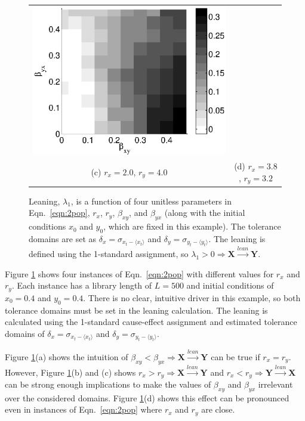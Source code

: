 \documentclass[twocolumn,aps,pre,groupedaddress]{revtex4-1}
\begin{document}
\begin{figure}[ht]
\begin{tabular}{cc}
\includegraphics[scale=0.30]{CoupLogexample_rx38ry32.eps} \\
(c) $r_x = 2.0$, $r_y = 4.0$ & (d) $r_x = 3.8$, $r_y = 3.2$ \\
\end{tabular}
\caption{Leaning, $\lambda_1$, is a function of four unitless parameters in Eqn.\ \ref{eqn:2pop}, $r_x$, $r_y$, $\beta_{xy}$, and $\beta_{yx}$ (along with the initial conditions $x_0$ and $y_0$, which are fixed in this example).  The tolerance domains are set as $\delta_x = \sigma_{x_t-\langle x_t \rangle}$ and $\delta_y = \sigma_{y_t-\langle y_t \rangle}$.  The leaning is defined using the 1-standard assignment, so $\lambda_1>0\Rightarrow\mathbf{X}\xrightarrow{lean}\mathbf{Y}$.}
\label{fig:2pop}
\end{figure}
Figure \ref{fig:2pop} shows four instances of Eqn.\ \ref{eqn:2pop} with different values for $r_x$ and $r_y$.  Each instance has a library length of $L=500$ and initial conditions of $x_0 = 0.4$ and $y_0 = 0.4$.  There is no clear, intuitive driver in this example, so both tolerance domains must be set in the leaning calculation.  The leaning is calculated using the 1-standard cause-effect assignment and estimated tolerance domains of $\delta_x = \sigma_{x_t-\langle x_t \rangle}$ and $\delta_y = \sigma_{y_t-\langle y_t \rangle}$.

Figure \ref{fig:2pop}(a) shows the intuition of $\beta_{xy}<\beta_{yx}\Rightarrow\mathbf{X}\xrightarrow{lean}\mathbf{Y}$ can be true if $r_x=r_y$.  However, Figure \ref{fig:2pop}(b) and (c) shows $r_x>r_y\Rightarrow\mathbf{X}\xrightarrow{lean}\mathbf{Y}$ and $r_x<r_y\Rightarrow\mathbf{Y}\xrightarrow{lean}\mathbf{X}$ can be strong enough implications to make the values of $\beta_{xy}$ and $\beta_{yx}$ irrelevant over the considered domains.  Figure \ref{fig:2pop}(d) shows this effect can be pronounced even in instances of Eqn.\ \ref{eqn:2pop} where $r_x$ and $r_y$ are close.  
\end{document}
